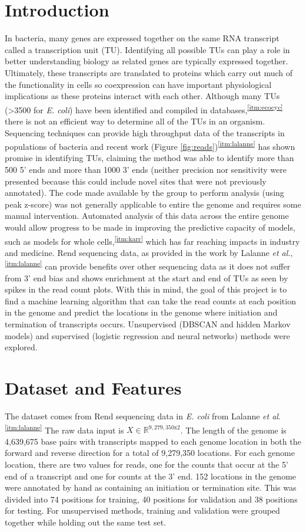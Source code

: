 \documentclass{article}
\newcommand{\cited}[1]{\textsuperscript{\ref{itm:#1}}}
\begin{document}
\section{Introduction}
In bacteria, many genes are expressed together on the same RNA transcript called a transcription unit (TU). Identifying all possible TUs can play a role in better understanding biology as related genes are typically expressed together.  Ultimately, these transcripts are translated to proteins which carry out much of the functionality in cells so coexpression can have important physiological implications as these proteins interact with each other.  Although many TUs (>3500 for \textit{E. coli}) have been identified and compiled in databases,\cited{ecocyc} there is not an efficient way to determine all of the TUs in an organism.  Sequencing techniques can provide high throughput data of the transcripts in populations of bacteria and recent work (Figure \ref{fig:reads})\cited{lalanne} has shown promise in identifying TUs, claiming the method was able to identify more than 500 5' ends and more than 1000 3' ends (neither precision nor sensitivity were presented because this could include novel sites that were not previously annotated).  The code made available by the group to perform analysis (using peak z-score) was not generally applicable to entire the genome and requires some manual intervention.  Automated analysis of this data across the entire genome would allow progress to be made in improving the predictive capacity of models, such as models for whole cells,\cited{karr} which has far reaching impacts in industry and medicine. Rend sequencing data, as provided in the work by Lalanne \textit{et al.},\cited{lalanne} can provide benefits over other sequencing data as it does not suffer from 3' end bias and shows enrichment at the start and end of TUs as seen by spikes in the read count plots.  With this in mind, the goal of this project is to find a machine learning algorithm that can take the read counts at each position in the genome and predict the locations in the genome where initiation and termination of transcripts occurs.  Unsupervised (DBSCAN and hidden Markov models) and supervised (logistic regression and neural networks) methods were explored.

\section{Dataset and Features}
The dataset comes from Rend sequencing data in \textit{E. coli} from Lalanne \textit{et al}.\cited{lalanne} The raw data input is $X\in \mathbb{R}^{9,279,350\text{x}2}$. The length of the genome is 4,639,675 base pairs with transcripts mapped to each genome location in both the forward and reverse direction for a total of 9,279,350 locations.  For each genome location, there are two values for reads, one for the counts that occur at the 5' end of a transcript and one for counts at the 3' end. 152 locations in the genome were annotated by hand as containing an initiation or termination site.  This was divided into 74 positions for training, 40 positions for validation and 38 positions for testing.  For unsupervised methods, training and validation were grouped together while holding out the same test set.
\end{document}
